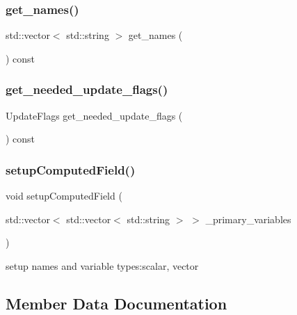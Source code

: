 \mbox{\label{classcomputed_field_a08e571d88aae15fdb3162f74bf9fd6e7}} 
\subsubsection{\texorpdfstring{get\_names()}{get\_names()}}
{\footnotesize\ttfamily std\+::vector$<$ std\+::string $>$ get\+\_\+names (\begin{DoxyParamCaption}{ }\end{DoxyParamCaption}) const}

\mbox{\label{classcomputed_field_ac3df6aa570f6a91215394fd4951e9f93}} 
\subsubsection{\texorpdfstring{get\_needed\_update\_flags()}{get\_needed\_update\_flags()}}
{\footnotesize\ttfamily Update\+Flags get\+\_\+needed\+\_\+update\+\_\+flags (\begin{DoxyParamCaption}{ }\end{DoxyParamCaption}) const\hspace{0.3cm}{\ttfamily [virtual]}}

\mbox{\label{classcomputed_field_ac6ff6cde468abcaa2ee7c9c4fd6b9047}} 
\subsubsection{\texorpdfstring{setupComputedField()}{setupComputedField()}}
{\footnotesize\ttfamily void setup\+Computed\+Field (\begin{DoxyParamCaption}\item[{std\+::vector$<$ std\+::vector$<$ std\+::string $>$ $>$}]{\+\_\+primary\+\_\+variables }\end{DoxyParamCaption})}

setup names and variable types\+:scalar, vector 

\subsection{Member Data Documentation}
\mbox{\label{classcomputed_field_a4933860ad833b7b9bd2b8effee5c36d6}} 
